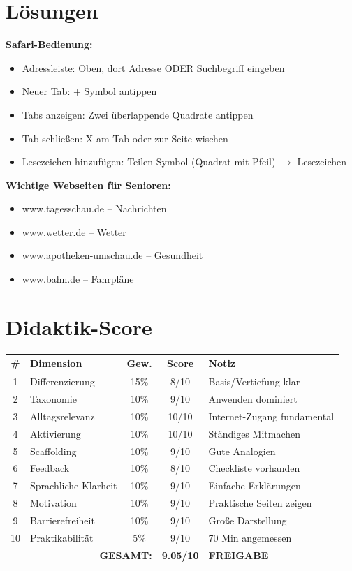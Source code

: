 \documentclass[11pt,a4paper]{article}
\begin{document}
\section{Lösungen}

\textbf{Safari-Bedienung:}
\begin{itemize}
    \item Adressleiste: Oben, dort Adresse ODER Suchbegriff eingeben
    \item Neuer Tab: + Symbol antippen
    \item Tabs anzeigen: Zwei überlappende Quadrate antippen
    \item Tab schließen: X am Tab oder zur Seite wischen
    \item Lesezeichen hinzufügen: Teilen-Symbol (Quadrat mit Pfeil) $\rightarrow$ Lesezeichen
\end{itemize}

\textbf{Wichtige Webseiten für Senioren:}
\begin{itemize}
    \item www.tagesschau.de -- Nachrichten
    \item www.wetter.de -- Wetter
    \item www.apotheken-umschau.de -- Gesundheit
    \item www.bahn.de -- Fahrpläne
\end{itemize}

\section{Didaktik-Score}

\begin{scorebox}
\begin{tabular}{|c|l|c|c|p{3.5cm}|}
\hline
\# & Dimension & Gew. & Score & Notiz \\
\hline
1 & Differenzierung & 15\% & 8/10 & Basis/Vertiefung klar \\
2 & Taxonomie & 10\% & 9/10 & Anwenden dominiert \\
3 & Alltagsrelevanz & 10\% & 10/10 & Internet-Zugang fundamental \\
4 & Aktivierung & 10\% & 10/10 & Ständiges Mitmachen \\
5 & Scaffolding & 10\% & 9/10 & Gute Analogien \\
6 & Feedback & 10\% & 8/10 & Checkliste vorhanden \\
7 & Sprachliche Klarheit & 10\% & 9/10 & Einfache Erklärungen \\
8 & Motivation & 10\% & 9/10 & Praktische Seiten zeigen \\
9 & Barrierefreiheit & 10\% & 9/10 & Große Darstellung \\
10 & Praktikabilität & 5\% & 9/10 & 70 Min angemessen \\
\hline
\multicolumn{3}{|r|}{\textbf{GESAMT:}} & \textbf{9.05/10} & \textcolor{successgreen}{\textbf{FREIGABE}} \\
\hline
\end{tabular}
\end{scorebox}
\end{document}
